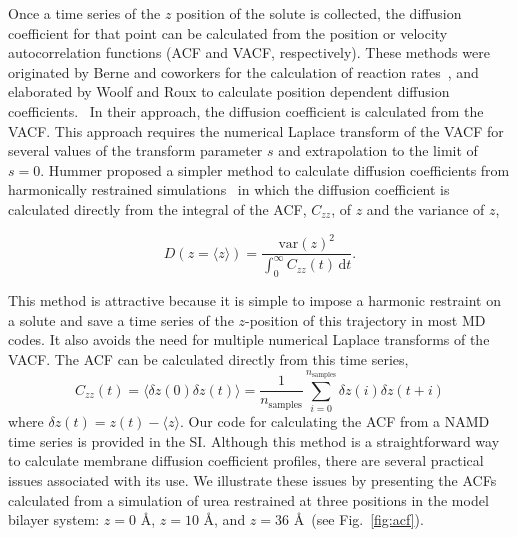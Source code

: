 \par Once a time series of the $z$ position of the solute is collected, the diffusion coefficient for that point can be calculated from the position or velocity autocorrelation functions (ACF and VACF, respectively).  These methods were originated by Berne and coworkers for the calculation of reaction rates~\cite{Berne1988}, and elaborated by Woolf and Roux to calculate position dependent diffusion coefficients.~\cite{Woolf1994} In their approach, the diffusion coefficient is calculated from the VACF. This approach requires the numerical Laplace transform of the VACF for several values of the transform parameter $s$ and extrapolation to the limit of $s=0$. Hummer proposed a simpler method to calculate diffusion coefficients from harmonically restrained simulations~\cite{Hummer2005} in which the diffusion coefficient is calculated directly  from the integral of the ACF, $C_{zz}$, of $z$ and the variance of $z$,

\begin{equation}
D(z= \langle z \rangle ) = \frac{\textrm{var}(z)^2}{\displaystyle \int_0^\infty C_{zz}(t) \, \textrm{d}t}.
\label{eq:diff_hummer}
\end{equation}

\par This method is attractive because it is simple to impose a harmonic restraint on a solute and save a time series of the $z$-position of this trajectory in most MD codes. It also avoids the need for multiple numerical Laplace transforms of the VACF. The ACF can be calculated directly from this time series,~\cite{Allen1989}
\begin{equation}
C_{zz}(t) =  \langle \delta z(0) \delta z(t) \rangle = \frac{1}{n_\mathrm{samples}}\sum\limits_{i=0}^{n_\mathrm{samples}} \delta z(i) \delta z(t+i)
\label{eq:correlation_sum}
\end{equation}
where $\delta z(t) = z(t)-\langle z \rangle$. Our code for calculating the ACF from a NAMD~\cite{Phillips2005}
time series is provided in the SI.
Although this method is a straightforward way to calculate membrane diffusion coefficient profiles, there are several practical issues associated with its use. We illustrate these issues by presenting the ACFs calculated from a simulation of urea restrained at three positions in the model bilayer system: $z=0$ \AA, $z=10$ \AA, and $z=36$ \AA\ (see Fig.~\ref{fig:acf}).

